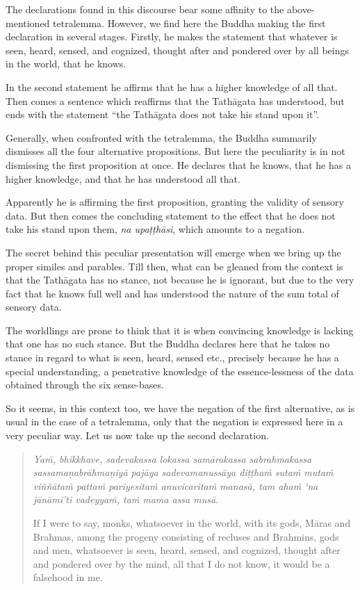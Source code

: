 The declarations found in this discourse bear some affinity to the above-mentioned tetralemma. However, we find here the Buddha making the first declaration in several stages. Firstly, he makes the statement that whatever is seen, heard, sensed, and cognized, thought after and pondered over by all beings in the world, that he knows.

In the second statement he affirms that he has a higher knowledge of all that. Then comes a sentence which reaffirms that the Tathāgata has understood, but ends with the statement ``the Tathāgata does not take his stand upon it''.

Generally, when confronted with the tetralemma, the Buddha summarily dismisses all the four alternative propositions. But here the peculiarity is in not dismissing the first proposition at once. He declares that he knows, that he has a higher knowledge, and that he has understood all that.

Apparently he is affirming the first proposition, granting the validity of sensory data. But then comes the concluding statement to the effect that he does not take his stand upon them, \emph{na upaṭṭhāsi}, which amounts to a negation.

The secret behind this peculiar presentation will emerge when we bring up the proper similes and parables. Till then, what can be gleaned from the context is that the Tathāgata has no stance, not because he is ignorant, but due to the very fact that he knows full well and has understood the nature of the sum total of sensory data.

The worldlings are prone to think that it is when convincing knowledge is lacking that one has no such stance. But the Buddha declares here that he takes no stance in regard to what is seen, heard, sensed etc., precisely because he has a special understanding, a penetrative knowledge of the essence-lessness of the data obtained through the six sense-bases.

So it seems, in this context too, we have the negation of the first alternative, as is usual in the case of a tetralemma, only that the negation is expressed here in a very peculiar way. Let us now take up the second declaration.

\begin{quote}
\emph{Yaṁ, bhikkhave, sadevakassa lokassa samārakassa sabrahmakassa sassamaṇabrāhmaṇiyā pajāya sadevamanussāya diṭṭhaṁ sutaṁ mutaṁ viññātaṁ pattaṁ pariyesitaṁ anuvicaritaṁ manasā, tam ahaṁ `na jānāmī'ti vadeyyaṁ, taṁ mama assa musā.}

If I were to say, monks, whatsoever in the world, with its gods, Māras and Brahmas, among the progeny consisting of recluses and Brahmins, gods and men, whatsoever is seen, heard, sensed, and cognized, thought after and pondered over by the mind, all that I do not know, it would be a falsehood in me.
\end{quote}

